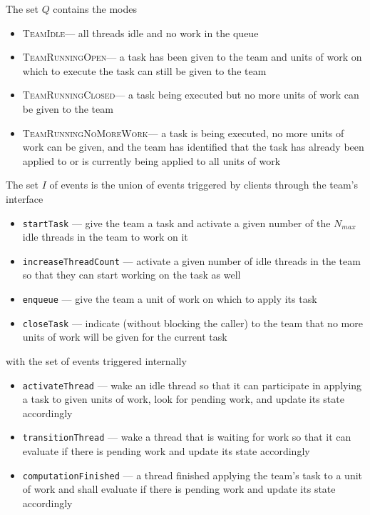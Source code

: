 \documentclass{article}
\newcommand{\TeamIdle}          {\textsc{TeamIdle}}
\newcommand{\TeamRunningOpen}   {\textsc{TeamRunningOpen}}
\newcommand{\TeamRunningClosed} {\textsc{TeamRunningClosed}}
\newcommand{\TeamRunningNoMoreWork} {\textsc{TeamRunningNoMoreWork}}
\newcommand{\TeamTerminating}   {\textsc{TeamTerminating}}
\begin{document}
The set $Q$ contains the modes
\begin{itemize}
\item{\TeamIdle --- all threads idle and no work in the queue}
\item{\TeamRunningOpen --- a task has been given to the team and units of work
on which to execute the task can still be given to the team}
\item{\TeamRunningClosed --- a task being executed but no more units
of work can be given to the team}
\item{\TeamRunningNoMoreWork --- a task is being executed, no more
units of work can be given, and the team has identified that the task has
already been applied to or is currently being applied to all units of work}
\end{itemize}

The set $I$ of events is the union of events triggered by clients through the
team's interface
\begin{itemize}
\item{\texttt{startTask} --- give the team a task and activate a given number of the
$N_{max}$ idle threads in the team to work on it}
\item{\texttt{increaseThreadCount} --- activate a given number of idle threads in the
team so that they can start working on the task as well}
\item{\texttt{enqueue} --- give the team a unit of work on which to apply its
task}
\item{\texttt{closeTask} --- indicate (without blocking the caller) to the team
that no more units of work will be given for the current task}
\end{itemize}
with the set of events triggered internally
\begin{itemize}
\item{\texttt{activateThread} --- wake an idle thread so that it can participate
in applying a task to given units of work, look for pending work, and update its
state accordingly}
\item{\texttt{transitionThread} --- wake a thread that is waiting for work so
that it can evaluate if there is pending work and update its state accordingly}
\item{\texttt{computationFinished} --- a thread finished applying the team's
task to a unit of work and shall evaluate if there is pending work and update
its state accordingly}
\end{itemize}
\end{document}
